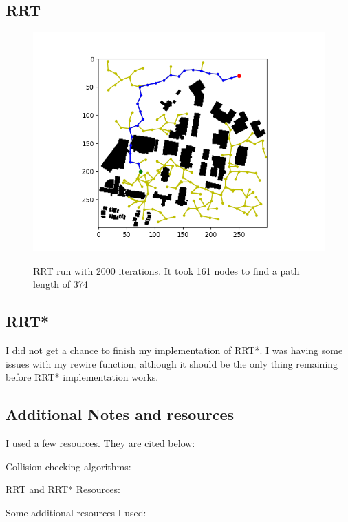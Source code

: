 \documentclass[journal]{IEEEtran}
\begin{document}
    \subsection{RRT}
    \begin{figure}[H]
        \includegraphics[width=\linewidth]{figures/RRT.png}
        \label{fig:RRT}
        \caption{RRT run with 2000 iterations. It took 161 nodes to find a path length of 374}
    \end{figure}
    
    \subsection{RRT*}
    I did not get a chance to finish my implementation of RRT*. I was having some issues with my rewire function, although it should be the only thing remaining before RRT* implementation works.


    \subsection{Additional Notes and resources}
    I used a few resources. They are cited below:

    Collision checking algorithms: \cite{FastProbabilisticCollisionChecking} \cite{EfficientCollisionChecking}

    RRT and RRT* Resources: \cite{chin_2019} \cite{RRT_RRT-star_Comparison} \cite{Wikipedia_RRT}

    Some additional resources I used: \cite{numpyrandomuniform} \cite{scipyspatialkdtree}

    \newpage
\end{document}
